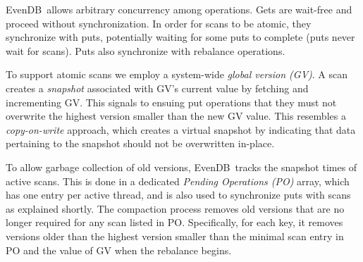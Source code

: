 \documentclass[sigplan,10pt]{acmart}
\newcommand{\remove}[1]{}
\newcommand{\sys}{EvenDB}
\begin{document}

\sys\ allows arbitrary concurrency among operations. Gets are wait-free and proceed without synchronization. 
In order for scans to be atomic, they synchronize with puts, potentially waiting for some puts to complete
(puts never wait for scans). Puts also synchronize with rebalance operations. 

\remove{
We note that using a single pending array to synchronize all operations can cause contention, which we
eliminate in our implementation by tracking the pending puts in per-chunk arrays with per-thread entries as done in~\cite{kiwi}.
}

To support atomic scans we employ a system-wide \emph{global version (GV)}. 
A scan  creates a \emph{snapshot} associated with GV's current value by fetching and incrementing GV.
This signals to ensuing put operations that they must not overwrite the highest
version smaller than the new GV value.
This resembles a \emph{copy-on-write} approach, which  creates a virtual snapshot by 
indicating that data pertaining to the snapshot should not be overwritten in-place.  

To allow garbage collection of old versions, \sys\  tracks the snapshot times of active scans.
This is done in a dedicated  \emph{Pending Operations (PO)} array, which has one entry per active thread,
and is also used to synchronize puts with scans as explained shortly.
The compaction process 
removes old versions that are no longer required for any  
scan listed in PO. Specifically, for each key, it removes versions older than the highest version smaller than the minimal
scan entry in PO and the value of GV when the rebalance begins. 

\remove{
For linearizing (i.e., determining an order on) updates, we associate each KV pair written to the data store 
with a unique-per-key timestamp.
This timestamp is composed as a tuple $\langle$ver, gen, seq$\rangle$, where \emph{ver} is  the version read from GV 
(recall that GV is only incremented upon scans and hence might remain unchanged across multiple puts),
\emph{gen} is the generation of the target chunk's last created munk  (which may or may not still exist), 
and seq is the running sequence number of values inserted to the chunk in the current generation.
}
\end{document}
